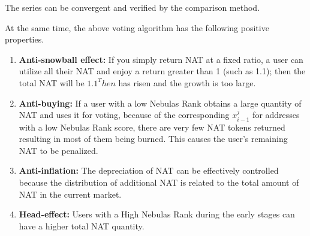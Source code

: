 The series can be convergent and verified by the comparison method.

At the same time, the above voting algorithm has the following positive properties.
\begin{enumerate}
	\item \textbf{Anti-snowball effect:} If you simply return NAT at a fixed ratio, a user can utilize all their NAT and enjoy a return greater than 1 (such as 1.1); then the total NAT will be $1.1^ The n$ has risen and the growth is too large.
	\item \textbf{Anti-buying:} If a user with a low Nebulas Rank obtains a large quantity of NAT and uses it for voting, because of the corresponding $x_{i-1}^j$ for addresses with a low Nebulas Rank score, there are very few NAT tokens returned resulting in most of them being burned. This causes the user's remaining NAT to be penalized.
	\item \textbf{Anti-inflation:} The depreciation of NAT can be effectively controlled because the distribution of additional NAT is related to the total amount of NAT in the current market.
	\item \textbf{Head-effect:} Users with a High Nebulas Rank during the early stages can have a higher total NAT quantity.
\end{enumerate}
